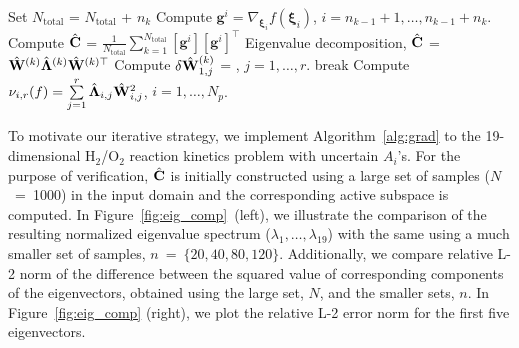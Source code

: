 \begin{breakablealgorithm}
\begin{algorithmic}[1]
		\State Set $N_\text{total}$ = $N_\text{total}$ + $n_k$ 
		\State Compute $\bm{g}^i = \nabla_{\bm{\xi}_i}f(\bm{\xi}_i)$, 
             	$i=n_{k-1}+1, \ldots, n_{k-1}+n_k$.  
		\State Compute $\hat{\mathbf{{C}}}$ = 
        	$\frac{1}{N_\text{total}}\sum\limits_{k=1}^{N_\text{total}}[\bm{g}^i][\bm{g}^i]^\top$
		\State Eigenvalue decomposition, $\hat{\mathbf{{C}}}$ = $\hat{\mathbf{{W}}}^{(k)}\hat{\mathbf{{\Lambda}}}^{(k)}
		 \hat{\mathbf{{W}}}^{(k)\top}$
		\State Compute $\delta \hat{\mathbf{{W}}}_{1,j}^{(k)}$ = 
                       , 
                       $j = 1,\ldots,r$.
			\State break
		\EndIf
	\EndLoop
	\State Compute $\nu_{i,r}(f) = \sum\limits_{j=1}^{r} \hat{\mathbf{{\Lambda}}}_{i,j}\hat{\mathbf{{W}}}_{i,j}^2$,
	$i=1,\ldots,N_p$.
	
    \EndProcedure
  \end{algorithmic}
  \label{alg:grad}
\end{breakablealgorithm}
\bigskip

To motivate our iterative strategy, we implement
Algorithm~\ref{alg:grad} to the 19-dimensional H$_2$/O$_2$ reaction kinetics
problem with uncertain $A_i$'s. For the purpose of verification,
$\hat{\mathbf{{C}}}$ is initially constructed using a large set of samples
($N$~=~1000) in the input domain and the corresponding active subspace is
computed. In Figure~\ref{fig:eig_comp}~(left), we illustrate the comparison of
the resulting normalized eigenvalue spectrum ($\lambda_1, \ldots, 
\lambda_{19}$) with the same using a much 
smaller set of samples, $n$~=~$\{20,40,80,120\}$.
Additionally, we compare relative L-2
norm of the difference between the squared value of corresponding components
of the eigenvectors, obtained using the large set, $N$, and the smaller sets, $n$.
In  Figure~\ref{fig:eig_comp} (right), we plot the relative L-2 error norm for the
first five eigenvectors. 

